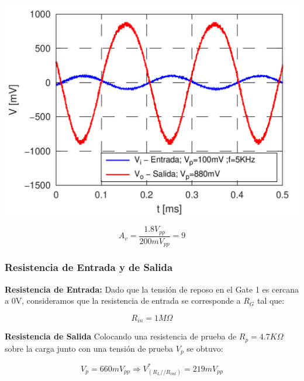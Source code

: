 \documentclass[a4paper, 10pt, spanish]{article}
\begin{document}
\begin{center}
  \includegraphics[width=.7\textwidth]{AvTRUCHO.png}
  \label{fig:av_med}
\end{center}


\begin{equation}
  A_v=\frac{1.8V_{pp}}{200mV_{pp}}=9
\end{equation}

\subsubsection{Resistencia de Entrada y de Salida}
\textbf{Resistencia de Entrada:}
Dado que la tensión de reposo en el Gate 1 es cercana a 0V, consideramos que la resistencia de entrada se corresponde a $R_G$ tal que:

\begin{equation}
  R_{in}=1M\Omega
\end{equation}

\textbf{Resistencia de Salida}
Colocando una resistencia de prueba de $R_p = 4.7K\Omega$ sobre la carga junto con una tensión de prueba $V_p$ se obtuvo:

\begin{equation}
  V_p= 660mV_{pp} \Rightarrow V^*_{(R_L//R_{out})} = 219 mV_{pp}
\end{equation}
\end{document}
